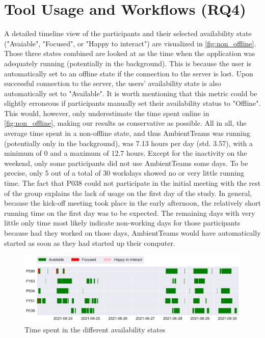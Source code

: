 \section{Tool Usage and Workflows (RQ4)}
\label{section:tool_usage_and_workflows}

A detailed timeline view of the participants and their selected availability state ("Avaiable", "Focused", or "Happy to interact") are visualized in \autoref{fig:non_offline}. Those three states combined are looked at as the time when the application was adequately running (potentially in the background). This is because the user is automatically set to an offline state if the connection to the server is lost. Upon successful connection to the server, the users' availability state is also automatically set to "Available". It is worth mentioning that this metric could be slightly erroneous if participants manually set their availability status to "Offline". This would, however, only underestimate the time spent online in \autoref{fig:non_offline}, making our results as conservative as possible. All in all, the average time spent in a non-offline state, and thus AmbientTeams was running (potentially only in the background), was 7.13 hours per day (std. 3.57), with a minimum of 0 and a maximum of 12.7 hours. Except for the inactivity on the weekend, only some participants did not use AmbientTeams some days. To be precise, only 5 out of a total of 30 workdays showed no or very little running time. The fact that P038 could not participate in the initial meeting with the rest of the group explains the lack of usage on the first day of the study. In general, because the kick-off meeting took place in the early afternoon, the relatively short running time on the first day was to be expected. The remaining days with very little only time most likely indicate non-working days for those participants because had they worked on those days, AmbientTeams would have automatically started as soon as they had started up their computer.

\begin{figure}[h]
    \centering
    \includegraphics[width=\linewidth]{plots/non_offline.pdf}
    \caption{Time spent in the different availability states}
    \label{fig:non_offline}
\end{figure}

